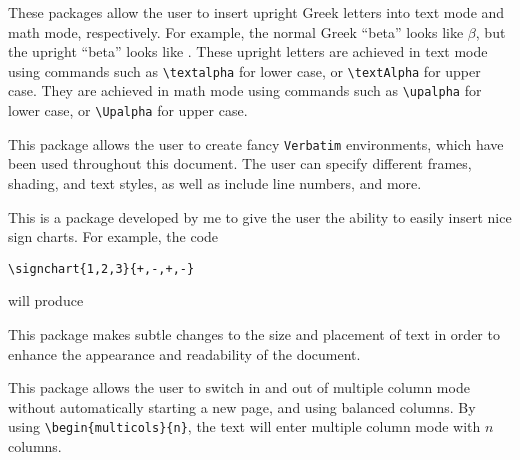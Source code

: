 \documentclass[letterpaper,12pt]{article}
\begin{document}
\begin{description}[align=margin,labelsep=0pt,leftmargin=0pt,style=multiline,labelwidth=63pt]
{}
\item[\href{http://mirrors.rit.edu/CTAN/macros/latex/contrib/textgreek/textgreek.pdf}{\texttt{textgreek}}, \\ \href{http://mirror.utexas.edu/ctan/macros/latex/contrib/was/upgreek.pdf}{\texttt{upgreek}}] These packages allow the user to insert upright Greek letters into text mode and math mode, respectively. For example, the normal Greek ``beta'' looks like $\beta$, but the upright ``beta'' looks like \textbeta. These upright letters are achieved in text mode using commands such as \verb|\textalpha| for lower case, or \verb|\textAlpha| for upper case. They are achieved in math mode using commands such as \verb|\upalpha| for lower case, or \verb|\Upalpha| for upper case.


{}
\item[\href{http://mirrors.concertpass.com/tex-archive/macros/latex/contrib/fancyvrb/fancyvrb.pdf}{\texttt{fancyvrb}}] This package allows the user to create fancy \texttt{Verbatim} environments, which have been used throughout this document. The user can specify different frames, shading, and text styles, as well as include line numbers, and more.


{}
\item[\href{http://mirror.utexas.edu/ctan/macros/latex/contrib/signchart/signchart.pdf}{\texttt{signchart}}]
This is a package developed by me to give the user the ability to easily insert nice sign charts. For example, the code

\begin{Verbatim}[frame=single,gobble=0,fontsize=\small]
\signchart{1,2,3}{+,-,+,-}
\end{Verbatim}

will produce

\begin{shaded*}
\end{shaded*}


{}
\item[\href{http://mirrors.concertpass.com/tex-archive/macros/latex/contrib/microtype/microtype.pdf}{\texttt{microtype}}]
This package makes subtle changes to the size and placement of text in order to 
enhance the appearance and readability of the document.


{}
\item[\href{http://get-software.net/macros/latex/required/tools/multicol.pdf}{\texttt{multicol}}]
This package allows the user to switch in and out of multiple column mode 
without automatically starting a new page, and using balanced columns. By using 
\verb|\begin{multicols}{n}|, the text will enter multiple column mode with $n$ 
columns.

\end{description}
\end{document}
